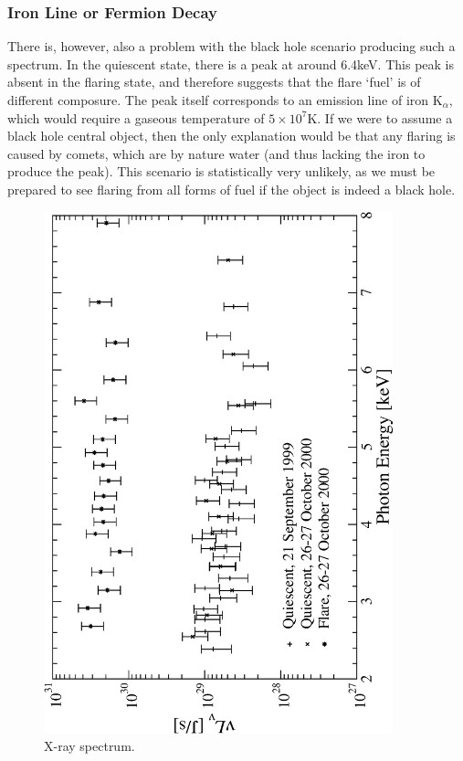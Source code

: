 \subsubsection{Iron Line or Fermion Decay}
\label{sec_fermiondecay}
There is, however, also a problem with the black hole scenario producing
such a spectrum. In the quiescent state, there is a peak at around 6.4keV. This peak is absent in the flaring state, and therefore suggests
that the flare `fuel' is of different composure. The peak itself corresponds to an emission line of iron K$_\alpha$, which would require a
gaseous temperature of $5\times 10^7$K. If we were to assume a black hole central object, then the only explanation would
be that any flaring is caused by comets, which are by nature water (and thus lacking the iron to produce the peak). This scenario is
statistically very unlikely, as we must be prepared to see flaring from all forms of fuel if the object is indeed a black hole.
\begin{figure}[ht]
	\begin{center}
	\includegraphics[angle=-90,width=0.9\textwidth]{eps/xray-nulum.eps}
	\caption{X-ray spectrum.}
	\label{fig_fredxray}
	\end{center}
\end{figure}


